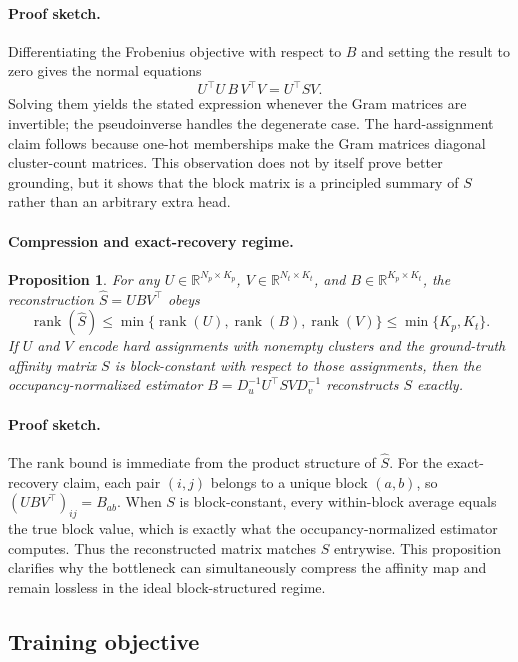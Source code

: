 \documentclass[11pt,a4paper]{article}
\newcommand{\R}{\mathbb{R}}
\newtheorem{proposition}{Proposition}
\begin{document}
\paragraph{Proof sketch.}
Differentiating the Frobenius objective with respect to $B$ and setting the result to zero gives the normal equations
\[
U^{\top}U\,B\,V^{\top}V = U^{\top}SV.
\]
Solving them yields the stated expression whenever the Gram matrices are invertible; the pseudoinverse handles the degenerate case. The hard-assignment claim follows because one-hot memberships make the Gram matrices diagonal cluster-count matrices. This observation does not by itself prove better grounding, but it shows that the block matrix is a principled summary of $S$ rather than an arbitrary extra head.

\paragraph{Compression and exact-recovery regime.}
\begin{proposition}
\label{prop:rank-recovery}
For any $U \in \R^{N_p \times K_p}$, $V \in \R^{N_t \times K_t}$, and $B \in \R^{K_p \times K_t}$, the reconstruction $\hat{S} = UBV^{\top}$ obeys
\[
\operatorname{rank}(\hat{S}) \le \min\{\operatorname{rank}(U),\operatorname{rank}(B),\operatorname{rank}(V)\} \le \min\{K_p,K_t\}.
\]
If $U$ and $V$ encode hard assignments with nonempty clusters and the ground-truth affinity matrix $S$ is block-constant with respect to those assignments, then the occupancy-normalized estimator $B = D_u^{-1}U^{\top}SV D_v^{-1}$ reconstructs $S$ exactly.
\end{proposition}
\paragraph{Proof sketch.}
The rank bound is immediate from the product structure of $\hat{S}$. For the exact-recovery claim, each pair $(i,j)$ belongs to a unique block $(a,b)$, so $(UBV^{\top})_{ij}=B_{ab}$. When $S$ is block-constant, every within-block average equals the true block value, which is exactly what the occupancy-normalized estimator computes. Thus the reconstructed matrix matches $S$ entrywise. This proposition clarifies why the bottleneck can simultaneously compress the affinity map and remain lossless in the ideal block-structured regime.

\subsection{Training objective}
\end{document}

